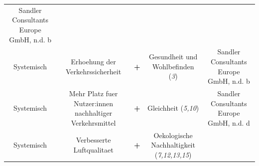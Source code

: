 \documentclass[
]{book}
\begin{document}
\begin{longtable}[]{@{}ccccc@{}}
\begin{minipage}[t]{0.17\columnwidth}
Sandler Consultants Europe GmbH, n.d. b\strut
\end{minipage}\tabularnewline
\begin{minipage}[t]{0.17\columnwidth}\centering
Systemisch\strut
\end{minipage} & \begin{minipage}[t]{0.16\columnwidth}\centering
Erhoehung der Verkehrssicherheit\strut
\end{minipage} & \begin{minipage}[t]{0.17\columnwidth}\centering
\textbf{+}\strut
\end{minipage} & \begin{minipage}[t]{0.17\columnwidth}\centering
Gesundheit und Wohlbefinden (\emph{3})\strut
\end{minipage} & \begin{minipage}[t]{0.17\columnwidth}\centering
Sandler Consultants Europe GmbH, n.d. b\strut
\end{minipage}\tabularnewline
\begin{minipage}[t]{0.17\columnwidth}\centering
Systemisch\strut
\end{minipage} & \begin{minipage}[t]{0.16\columnwidth}\centering
Mehr Platz fuer Nutzer:innen nachhaltiger Verkehrsmittel\strut
\end{minipage} & \begin{minipage}[t]{0.17\columnwidth}\centering
\textbf{+}\strut
\end{minipage} & \begin{minipage}[t]{0.17\columnwidth}\centering
Gleichheit (\emph{5,10})\strut
\end{minipage} & \begin{minipage}[t]{0.17\columnwidth}\centering
Sandler Consultants Europe GmbH, n.d. d\strut
\end{minipage}\tabularnewline
\begin{minipage}[t]{0.17\columnwidth}\centering
Systemisch\strut
\end{minipage} & \begin{minipage}[t]{0.16\columnwidth}\centering
Verbesserte Luftqualitaet\strut
\end{minipage} & \begin{minipage}[t]{0.17\columnwidth}\centering
\textbf{+}\strut
\end{minipage} & \begin{minipage}[t]{0.17\columnwidth}\centering
Oekologische Nachhaltigkeit (\emph{7,12,13,15})\strut
\end{minipage} & \begin{minipage}[t]{0.17\columnwidth}\centering

\end{minipage}
\end{longtable}
\end{document}
